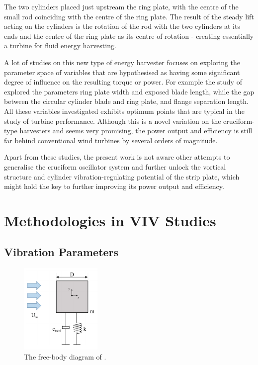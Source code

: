 \documentclass[oneside]{utmthesis}
\begin{document}
The two cylinders placed just upstream the ring plate, with the centre of the small rod coinciding with the centre of the ring plate. The result of the steady lift acting on the cylinders is the rotation of the rod with the two cylinders at its ends and the centre of the ring plate as its centre of rotation - creating essentially a turbine for fluid energy harvesting.

A lot of studies on this new type of energy harvester focuses on exploring the parameter space of variables that are hypothesised as having some significant degree of influence on the resulting torque or power. For example the study of \citet{Hemsuwan2021} explored the parameters ring plate width and exposed blade length, while \citet{Sakamoto2021} the gap between the circular cylinder blade and ring plate, and flange separation length. All these variables investigated exhibits optimum points that are typical in the study of turbine performance. Although this is a novel variation on the cruciform-type harvesters and seems very promising, the power output and efficiency is still far behind conventional wind turbines by several orders of magnitude.

Apart from these studies, the present work is not aware other attempts to generalise the cruciform oscillator system and further unlock the vortical structure and cylinder vibration-regulating potential of the strip plate, which might hold the key to further improving its power output and efficiency.

\section{Methodologies in VIV Studies} \label{sec:vivMethods}

\vspace{\baselineskip}

\subsection{Vibration Parameters} \label{ssec:vibPara}

\begin{figure}[!h]
  \centering
  \hspace{1cm} \includegraphics[width=0.35\textwidth]{figs/shafinazFBD}
  \caption{The free-body diagram of \citet{Maruai2019}.}
  \label{fig:shafinazFBD}
\end{figure}
\end{document}
